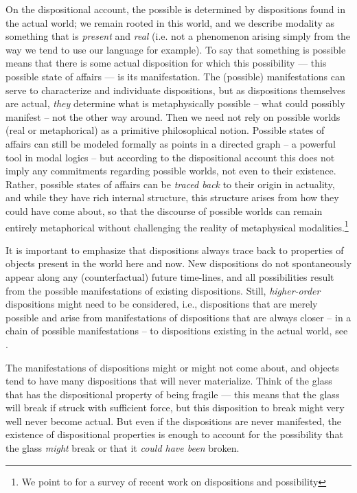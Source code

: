 \documentclass{article}
\begin{document}
On the dispositional account, the possible is determined by dispositions found in the actual world; we remain rooted in this world, and we describe modality as something that is \emph{present} and \emph{real} (i.e. not a phenomenon arising simply from the way we tend to use our language for example). To say that something is possible means that there is some actual disposition for which this possibility --- this possible state of affairs --- is its manifestation. The (possible) manifestations can serve to characterize and individuate dispositions, but as dispositions themselves are actual, \emph{they} determine what is metaphysically possible -- what could possibly manifest -- not the other way around. Then we need not rely on possible worlds (real or metaphorical) as a primitive philosophical notion. Possible states of affairs can still be modeled formally as points in a directed graph -- a powerful tool in modal logics -- but according to the dispositional account this does not imply any commitments regarding possible worlds, not even to their existence. Rather, possible states of affairs can be \emph{traced back} to their origin in actuality, and while they have rich internal structure, this structure arises from how they could have come about, so that the discourse of possible worlds can remain entirely metaphorical without challenging the reality of metaphysical modalities.\footnote{We point to \cite{MwPw} for a survey of recent work on dispositions and possibility}

It is important to emphasize that dispositions always trace back to properties of objects present in the world here and now. New dispositions do not spontaneously appear along any (counterfactual) future time-lines, and all possibilities result from the possible manifestations of existing dispositions. Still, \emph{higher-order} dispositions might need to be considered, i.e., dispositions that are merely possible and arise from manifestations of dispositions that are always closer -- in a chain of possible manifestations -- to dispositions existing in the actual world, see \cite{dispmod}.

The manifestations of dispositions might or might not come about, and objects tend to have many dispositions that will never materialize. Think of the glass that has the dispositional property of being fragile --- this means that the glass will break if struck with sufficient force, but this disposition to break might very well never become actual. But even if the dispositions are never manifested, the existence of dispositional properties is enough to account for the possibility that the glass \emph{might} break or that it \emph{could have been} broken.
\end{document}
